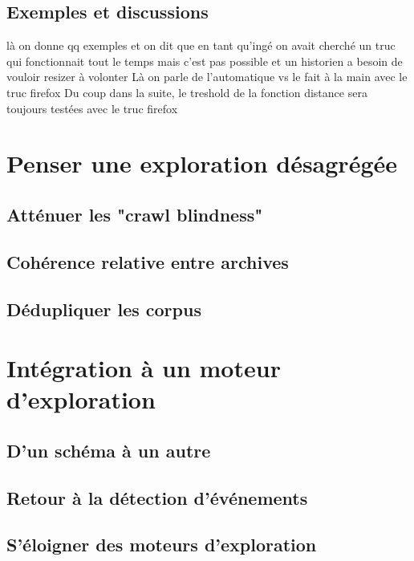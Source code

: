 \documentclass[symmetric,justified,marginals=raggedouter]{tufte-book}
\begin{document}
\subsection{Exemples et discussions}

là on donne qq exemples 
et on dit que en tant qu'ingé on avait cherché un truc qui fonctionnait tout le temps
mais c'est pas possible et un historien a besoin de vouloir resizer à volonter 
Là on parle de l'automatique vs le fait à la main avec le truc firefox
Du coup dans la suite, le treshold de la fonction distance sera toujours testées avec le truc firefox

\section{Penser une exploration désagrégée}

\subsection{Atténuer les "crawl blindness"}

\subsection{Cohérence relative entre archives}

\subsection{Dédupliquer les corpus}

\section{Intégration à un moteur d'exploration}

\subsection{D'un schéma à un autre}

\subsection{Retour à la détection d'événements}

\subsection{S'éloigner des moteurs d'exploration}
\end{document}
